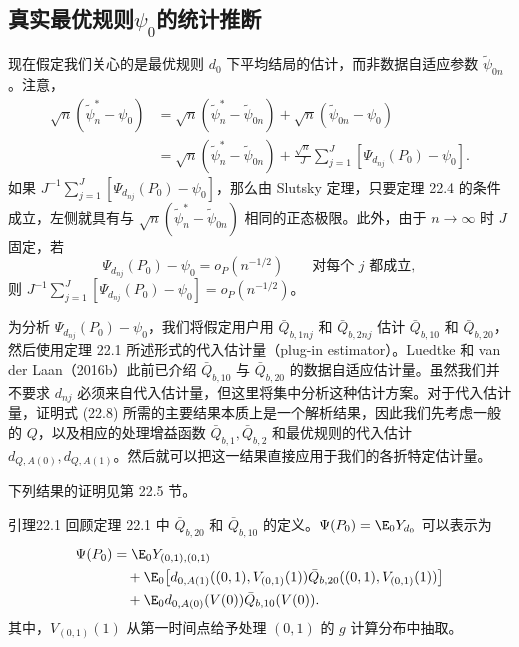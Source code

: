 \subsection{真实最优规则\texorpdfstring{$\psi_0$}{ψ₀}的统计推断}

现在假定我们关心的是最优规则 $d_0$ 下平均结局的估计，而非数据自适应参数 $\tilde\psi_{0n}$。注意，
\[
\begin{aligned}
 \sqrt n(\tilde\psi_n^*-\psi_0)
 &=\sqrt n(\tilde\psi_n^*-\tilde\psi_{0n})
 +\sqrt n(\tilde\psi_{0n}-\psi_0)\\
 &=\sqrt n(\tilde\psi_n^*-\tilde\psi_{0n})
 +\frac{\sqrt n}{J}\sum_{j=1}^J[\Psi_{d_{nj}}(P_0)-\psi_0].
\end{aligned}
\]
如果 $J^{-1}\sum_{j=1}^J[\Psi_{d_{nj}}(P_0)-\psi_0]$，那么由 Slutsky 定理，只要定理 22.4 的条件成立，左侧就具有与 $\sqrt n(\tilde\psi_n^*-\tilde\psi_{0n})$ 相同的正态极限。此外，由于 $n\to\infty$ 时 $J$ 固定，若
\begin{equation}
 \Psi_{d_{nj}}(P_0)-\psi_0=o_P(n^{-1/2})\qquad\text{对每个 }j\text{ 都成立},
\tag{22.8}
\end{equation}
则 $J^{-1}\sum_{j=1}^J[\Psi_{d_{nj}}(P_0)-\psi_0]=o_P(n^{-1/2})$。

为分析 $\Psi_{d_{nj}}(P_0)-\psi_0$，我们将假定用户用 $\bar Q_{b,1nj}$ 和 $\bar Q_{b,2nj}$ 估计 $\bar Q_{b,10}$ 和 $\bar Q_{b,20}$，然后使用定理 22.1 所述形式的代入估计量（plug-in estimator）。Luedtke 和 van der Laan（2016b）此前已介绍 $\bar Q_{b,10}$ 与 $\bar Q_{b,20}$ 的数据自适应估计量。虽然我们并不要求 $d_{nj}$ 必须来自代入估计量，但这里将集中分析这种估计方案。对于代入估计量，证明式 (22.8) 所需的主要结果本质上是一个解析结果，因此我们先考虑一般的 $Q$，以及相应的处理增益函数 $\bar Q_{b,1},\bar Q_{b,2}$ 和最优规则的代入估计 $d_{Q,A(0)},d_{Q,A(1)}$。然后就可以把这一结果直接应用于我们的各折特定估计量。

下列结果的证明见第 22.5 节。

\begin{bookresult}{引理}{22.1}
回顾定理 22.1 中 $\bar Q_{b,20}$ 和 $\bar Q_{b,10}$ 的定义。$\Psi(P_0)=\E_0Y_{d_0}$ 可以表示为
\[
\begin{aligned}
 \Psi(P_0)
 &=\E_0Y_{(0,1),(0,1)}\\
 &\quad+\E_0\bigl[d_{0,A(1)}((0,1),V_{(0,1)}(1))
 \bar Q_{b,20}((0,1),V_{(0,1)}(1))\bigr]\\
 &\quad+\E_0d_{0,A(0)}(V(0))\bar Q_{b,10}(V(0)).
\end{aligned}
\]
其中，$V_{(0,1)}(1)$ 从第一时间点给予处理 $(0,1)$ 的 $g$ 计算分布中抽取。
\end{bookresult}

